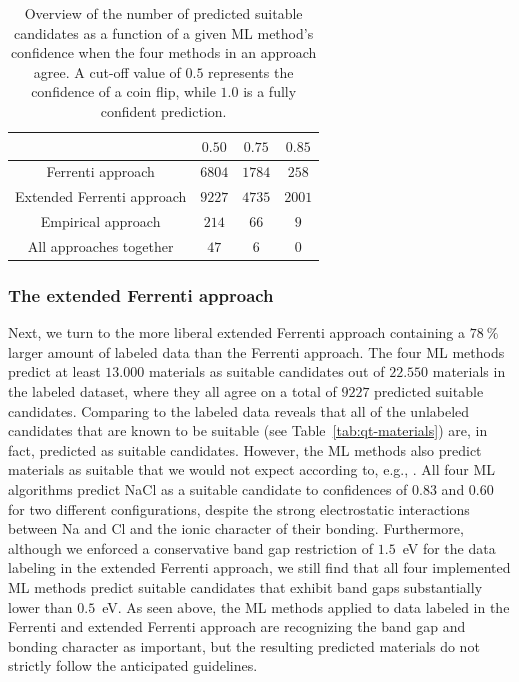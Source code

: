 \documentclass[superscriptaddress,unsortedaddress,
 amsmath,amssymb,
 aps,
]{revtex4-2}
\begin{document}
\begin{table}[t]
    \centering 
    \caption{Overview of the number of predicted suitable candidates as a function of a given ML method's confidence when the four methods in an approach agree. A cut-off value of $0.5$ represents the confidence of a coin flip, while $1.0$ is a fully confident prediction.}
    \begin{tabular}{c|c|c|c}
      & $0.50$ & $0.75$ & $0.85$ \\
     \hline
     Ferrenti approach &  $6804$ & $1784$ & $258$  \\
     Extended Ferrenti approach &  $9227$ & $4735$  & $2001$  \\ 
     Empirical approach & $214$ & $66$ & $9$ \\
     \hline
     All approaches together & $47$ & $6$ & 0 \\
    \end{tabular}
    \label{tab:probabilites}
\end{table} 


\subsubsection*{The extended Ferrenti approach}
Next, we turn to the more liberal extended Ferrenti approach containing a $78 \ \%$ larger 
amount of labeled data than the Ferrenti approach.  
The four ML methods predict at least $13.000$ materials as suitable candidates out of $22.550$ materials in the labeled dataset, where they all agree on a total of $9227$ predicted suitable candidates. Comparing to the labeled data reveals that all of the unlabeled candidates that are known to be suitable (see Table~\ref{tab:qt-materials}) are, in fact, predicted as suitable candidates. 
However, the ML methods also predict materials as suitable that we would not expect according to, e.g., \citeauthor{Weber2010} \cite{Weber2010}. 
All four ML algorithms predict NaCl as a suitable candidate to confidences of $0.83$ and $0.60$ for two different configurations, despite the strong electrostatic interactions between Na and Cl and the ionic character of their bonding.  
Furthermore, although we enforced a conservative band gap restriction of $1.5$~eV for the data labeling in the extended Ferrenti approach, we still find that all four implemented ML methods predict suitable candidates that exhibit band gaps substantially lower than $0.5$~eV.  
As seen above, the ML methods applied to data labeled in the Ferrenti and extended Ferrenti approach are recognizing the band gap and bonding character as important, but the resulting predicted materials do not strictly follow the anticipated guidelines. 
 
\end{document}
